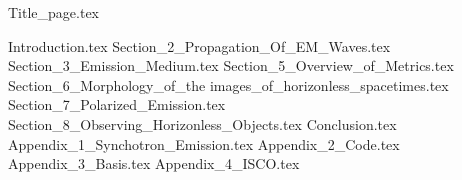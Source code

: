 \documentclass[12pt]{article}
\numberwithin{equation}{section}
\numberwithin{figure}{section}
\begin{document}
{Title_page.tex}
\newpage
\tableofcontents
\listoffigures
\listoftables
\newpage

\nocite{EHT_M87_I,
		EHT_M87_II,
		EHT_M87_III,
		EHT_M87_IV,
		EHT_M87_V,
		EHT_M87_VI,
		EHT_M87_VII,
		EHT_M87_VIII,
		EHT_M87_IX,
		EHT_SGR_I,
		EHT_SGR_II,
		EHT_SGR_III,
		EHT_SGR_IV,
		EHT_SGR_V,
		EHT_SGR_VI,
		EHT_SGR_VII,
		EHT_SGR_VIII}

{Introduction.tex}
\newpage
{Section_2_Propagation_Of_EM_Waves.tex}
\newpage
{Section_3_Emission_Medium.tex}
\newpage
{Section_5_Overview_of_Metrics.tex}
\newpage
{Section_6_Morphology_of_the images_of_horizonless_spacetimes.tex}
\newpage
{Section_7_Polarized_Emission.tex}
\newpage
{Section_8_Observing_Horizonless_Objects.tex}
\newpage
{Conclusion.tex}
\newpage
{Appendix_1_Synchotron_Emission.tex}
\newpage
{Appendix_2_Code.tex}
\newpage
{Appendix_3_Basis.tex}
\newpage
{Appendix_4_ISCO.tex}
\newpage



\end{document}

